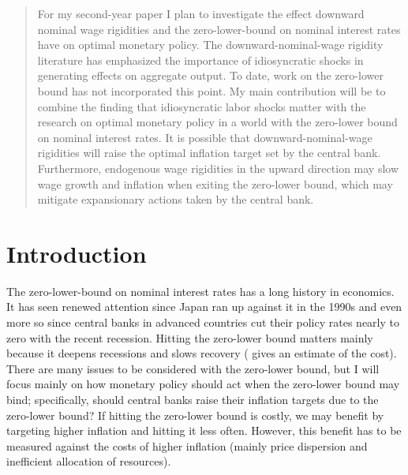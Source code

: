 \documentclass[12pt,a4paper]{article}            %
\begin{document}



\begin{abstract}
For my second-year paper I plan to investigate the effect downward nominal wage rigidities and the zero-lower-bound on nominal interest rates have on optimal monetary policy.
The downward-nominal-wage rigidity literature has emphasized the importance of idiosyncratic shocks in generating effects on aggregate output.
To date, work on the zero-lower bound has not incorporated this point.
My main contribution will be to combine the finding that idiosyncratic labor shocks matter with the research on optimal monetary policy in a world with the zero-lower bound on nominal interest rates.
It is possible that downward-nominal-wage rigidities will raise the optimal inflation target set by the central bank.
Furthermore, endogenous wage rigidities in the upward direction may slow wage growth and inflation when exiting the zero-lower bound, which may mitigate expansionary actions taken by the central bank.
\end{abstract}
\newpage
\section{Introduction}
\label{sec:introduction}

The zero-lower-bound on nominal interest rates has a long history in economics. It has seen renewed attention since Japan ran up against it in the 1990s and even more so since central banks in advanced countries cut their policy rates nearly to zero with the recent recession.
Hitting the zero-lower bound matters mainly because it deepens recessions and slows recovery (\cite{williams_2009} gives an estimate of the cost).
There are many issues to be considered with the zero-lower bound, but I will focus mainly on how monetary policy should act when the zero-lower bound may bind;
specifically, should central banks raise their inflation targets due to the zero-lower bound?
If hitting the zero-lower bound is costly, we may benefit by targeting higher inflation and hitting it less often.
However, this benefit has to be measured against the costs of higher inflation (mainly price dispersion and inefficient allocation of resources).
\end{document}
